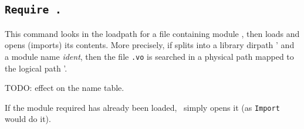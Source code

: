 







\subsection{\tt Require {\dirpath}.}
\label{Require}

This command looks in the loadpath for a file containing module
{\dirpath}, then loads and opens (imports) its contents.
More precisely, if {\dirpath} splits into a library dirpath {\dirpath'} and a module name {\textsl{ident}}, then the file {\ident}{\tt .vo} is searched in a physical path mapped to the logical path {\dirpath'}.

TODO: effect on the name table.

If the module required has already been loaded, \Coq\ 
simply opens it (as {\tt Import {\dirpath}} would do it).

